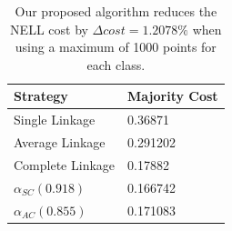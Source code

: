 \begin{table}[h]
    \centering
    \begin{tabular}{|l | l|}
    \hline
    Strategy & Majority Cost\\ \hline
    Single Linkage & 0.36871\\
    Average Linkage & 0.291202\\
    Complete Linkage & 0.17882\\
    \cellcolor{green!50}$\alpha_{SC}(0.918)$ & \cellcolor{green!50}0.166742\\
    $\alpha_{AC}(0.855)$ & 0.171083\\\hline
    \end{tabular}
    \caption{Our proposed algorithm reduces the NELL cost by $\Delta cost = 1.2078\%$ when using a maximum of 1000 points for each class.}
    \label{table:nell1000}
\end{table}

